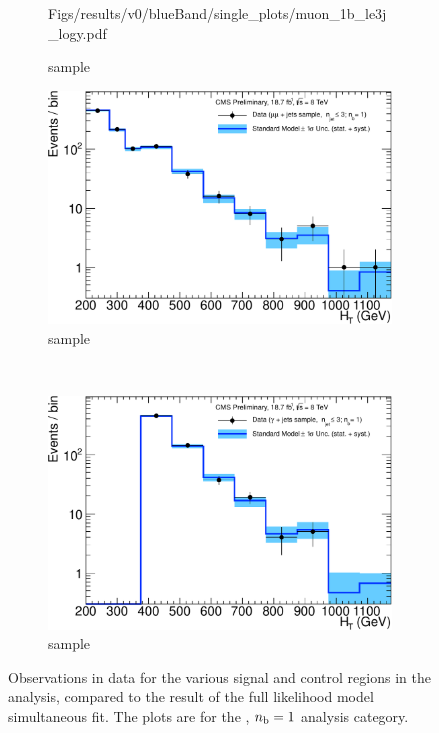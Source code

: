\begin{figure}[h!]
\begin{subfigure}[b]{0.48\textwidth}
    {Figs/results/v0/blueBand/single_plots/muon_1b_le3j_logy.pdf}
    \caption{\mj sample}
  \end{subfigure}
  \begin{subfigure}[b]{0.48\textwidth}
    \includegraphics[width=\textwidth]
    {Figs/results/v0/blueBand/single_plots/mumu_1b_le3j_logy.pdf}
    \caption{\mmj sample}
  \end{subfigure}\\
  \begin{subfigure}[b]{0.48\textwidth}
    \includegraphics[width=\textwidth]
    {Figs/results/v0/blueBand/single_plots/photon_1b_le3j_logy.pdf}
    \caption{\gj sample}
  \end{subfigure}
  \caption{Observations in data for the various signal and control
  regions in the analysis, compared to the result of the full likelihood model
  simultaneous fit. The plots are for the \njlow, $n_{\text{b}} = 1$ analysis category.}
  \label{fig:blue_fits_1b_le3j}
\end{figure}

